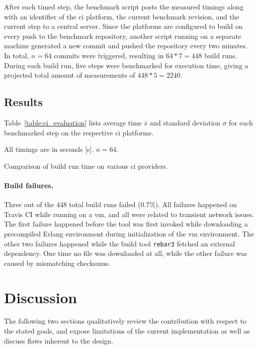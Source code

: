 After each timed step, the benchmark script posts the measured timings along with an identifier of the \acrshort{ci} platform, the current benchmark revision, and the current step to a central server. Since the platforms are configured to build on every push to the benchmark repository, another script running on a separate machine generated a new commit and pushed the repository every two minutes. In total, $n=64$ commits were triggered, resulting in $64*7=448$ build runs. During each build run, five steps were benchmarked for execution time, giving a projected total amount of measurements of $448*5=2240$.

\cleardoublepage
\subsection{Results}
Table~\ref{table:ci_evaluation} lists average time $\bar{s}$ and standard deviation $\sigma$ for each benchmarked step on the respective \acrshort{ci} platforms.

\begin{table}[h]
  \setlength{\tabcolsep}{8.6pt}
  \renewcommand{\arraystretch}{1.5}
  \centering
  
  \vspace{6pt}
  All timings are in seconds [s]. $n=64$.

  \caption{Comparison of build run time on various \acrshort{ci} providers.}\label{table:ci_evaluation}
\end{table}

\paragraph{Build failures.} Three out of the $448$ total build runs failed ($0.7\%$). All failures happened on Travis CI while running on a \acrshort{vm}, and all were related to transient network issues. The first failure happened before the tool was first invoked while downloading a precompiled Erlang environment during initialization of the \acrshort{vm} environment.
The other two failures happened while the build tool \lstinline|rebar3| fetched an external dependency. One time no file was downloaded at all, while the other failure was caused by mismatching checksums.

\cleardoublepage
\section{Discussion}

The following two sections qualitatively review the contribution with respect to the stated goals, and expose limitations of the current implementation as well as discuss flaws inherent to the design.


